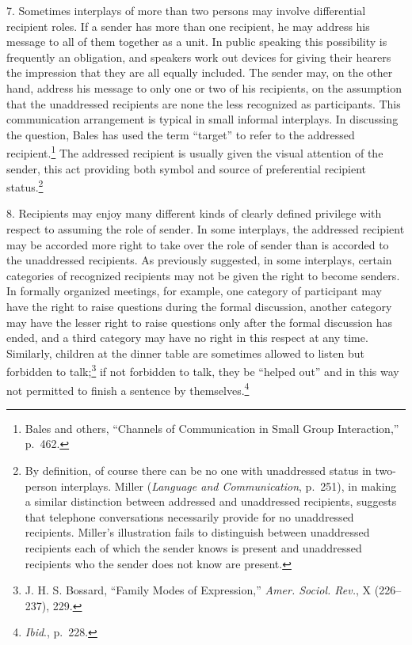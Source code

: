 \documentclass[openany,nobib]{tufte-book}
\begin{document}
7. Sometimes interplays of more than two persons may involve
differential recipient roles. If a sender has more than one recipient,
he may address his message to all of them together as a unit. In public
speaking this possibility is frequently an obligation, and speakers work
out devices for giving their hearers the impression that they are all
equally included. The sender may, on the other hand, address his message
to only one or two of his recipients, on the assumption that the
unaddressed recipients are none the less recognized as participants.
This communication arrangement is typical in small informal interplays.
In discussing the question, Bales has used the term ``target'' to refer
to the addressed recipient.\footnote{Bales and others, ``Channels of
  Communication in Small Group Interaction,'' p.~462.} The addressed
recipient is usually given the visual attention of the sender, this act
providing both symbol and source of preferential recipient
status.\footnote{By definition, of course there can be no one with
  unaddressed status in two-person interplays. Miller (\emph{Language
  and Communication}, p.~251), in making a similar distinction between
  addressed and unaddressed recipients, suggests that telephone
  conversations necessarily provide for no unaddressed recipients.
  Miller's illustration fails to distinguish between unaddressed
  recipients each of which the sender knows is present and unaddressed
  recipients who the sender does not know are present.}

8. Recipients may enjoy many different kinds of clearly defined
privilege with respect to assuming the role of sender. In some
interplays, the addressed recipient may be accorded more right to take
over the role of sender than is accorded to the unaddressed recipients.
As previously suggested, in some interplays, certain categories of
recognized recipients may not be given the right to become senders. In
formally organized meetings, for example, one category of participant
may have the right to raise questions during the formal discussion,
another category may have the lesser right to raise questions only after
the formal discussion has ended, and a third category may have no right
in this respect at any time. Similarly, children at the dinner table are
sometimes allowed to listen but forbidden to talk;\footnote{J. H. S.
  Bossard, ``Family Modes of Expression,'' \emph{Amer. Sociol. Rev.}, X
  (226--237), 229.} if not forbidden to talk, they be ``helped out'' and
in this way not permitted to finish a sentence by themselves.\footnote{\emph{Ibid}.,
  p.~228.}
\end{document}
